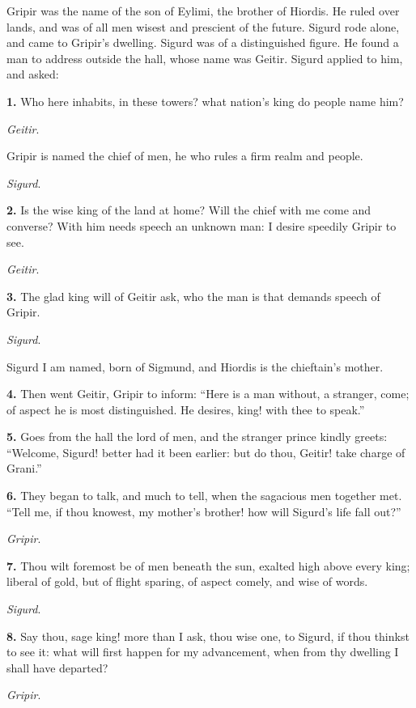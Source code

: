 
Gripir was the name of the son of Eylimi, the brother of Hiordis. He
ruled over lands, and was of all men wisest and prescient of the
future. Sigurd rode alone, and came to Gripir's dwelling. Sigurd was
of a distinguished figure. He found a man to address outside the hall,
whose name was Geitir. Sigurd applied to him, and asked:

\textbf{1.} Who here inhabits, in these towers? what nation's king do people
name him?

\emph{Geitir}.

Gripir is named the chief of men, he who rules a firm realm and
people.

\emph{Sigurd}.

\textbf{2.} Is the wise king of the land at home? Will the chief with me come
and converse? With him needs speech an unknown man: I desire speedily
Gripir to see.

\emph{Geitir}.

\textbf{3.} The glad king will of Geitir ask, who the man is that demands
speech of Gripir.

\emph{Sigurd}.

Sigurd I am named, born of Sigmund, and Hiordis is the chieftain's
mother.

\textbf{4.} Then went Geitir, Gripir to inform: ``Here is a man without, a
stranger, come; of aspect he is most distinguished. He desires, king!
with thee to speak.''

\textbf{5.} Goes from the hall the lord of men, and the stranger prince
kindly greets: ``Welcome, Sigurd! better had it been earlier: but do
thou, Geitir! take charge of Grani.''

\textbf{6.} They began to talk, and much to tell, when the sagacious men
together met. ``Tell me, if thou knowest, my mother's brother! how will
Sigurd's life fall out?''

\emph{Gripir}.

\textbf{7.} Thou wilt foremost be of men beneath the sun, exalted high above
every king; liberal of gold, but of flight sparing, of aspect comely,
and wise of words.

\emph{Sigurd}.

\textbf{8.} Say thou, sage king! more than I ask, thou wise one, to Sigurd,
if thou thinkst to see it: what will first happen for my advancement,
when from thy dwelling I shall have departed?

\emph{Gripir}.

